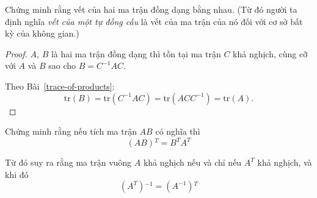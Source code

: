 \documentclass[class=nhvh-linear-algebra,crop=false]{standalone}
\begin{document}
\begin{exercise}
    Chứng minh rằng vết của hai ma trận đồng dạng bằng nhau. (Từ đó người ta định nghĩa \textit{vết của một tự đồng cấu} là vết của ma trận của nó đối với cơ sở bất kỳ của không gian.)
\end{exercise}

\begin{proof}
    $A$, $B$ là hai ma trận đồng dạng thì tồn tại ma trận $C$ khả nghịch, cùng cỡ với $A$ và $B$ sao cho $B = C^{-1}AC$.
    \par Theo Bài~\ref{trace-of-products}:
    \[
        \text{tr}(B) = \text{tr}(C^{-1}AC) = \text{tr}(ACC^{-1}) = \text{tr}(A).
    \]
\end{proof}

\begin{exercise}
    Chứng minh rằng nếu tích ma trận $AB$ có nghĩa thì
    \[
        (AB){}^{T} = B^{T}A^{T}
    \]
    \par Từ đó suy ra rằng ma trận vuông $A$ khả nghịch nếu và chỉ nếu $A^{T}$ khả nghịch, và khi đó
    \[
        (A^{T}){}^{-1} = (A^{-1}){}^{T}
    \]
\end{exercise}
\end{document}
